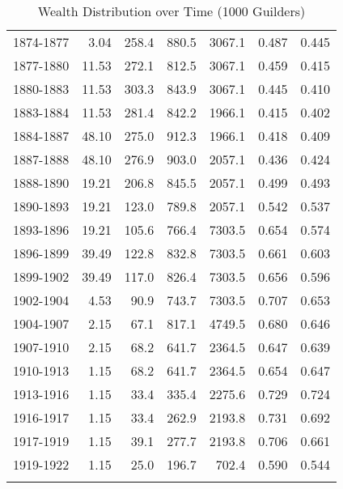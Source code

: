 \begin{table}[ht]
\begin{tabular}{lrrrrrr}
  1874-1877 & 3.04 & 258.4 & 880.5 & 3067.1 & 0.487 & 0.445 \\ 
  1877-1880 & 11.53 & 272.1 & 812.5 & 3067.1 & 0.459 & 0.415 \\ 
  1880-1883 & 11.53 & 303.3 & 843.9 & 3067.1 & 0.445 & 0.410 \\ 
  1883-1884 & 11.53 & 281.4 & 842.2 & 1966.1 & 0.415 & 0.402 \\ 
  1884-1887 & 48.10 & 275.0 & 912.3 & 1966.1 & 0.418 & 0.409 \\ 
  1887-1888 & 48.10 & 276.9 & 903.0 & 2057.1 & 0.436 & 0.424 \\ 
  1888-1890 & 19.21 & 206.8 & 845.5 & 2057.1 & 0.499 & 0.493 \\ 
  1890-1893 & 19.21 & 123.0 & 789.8 & 2057.1 & 0.542 & 0.537 \\ 
  1893-1896 & 19.21 & 105.6 & 766.4 & 7303.5 & 0.654 & 0.574 \\ 
  1896-1899 & 39.49 & 122.8 & 832.8 & 7303.5 & 0.661 & 0.603 \\ 
  1899-1902 & 39.49 & 117.0 & 826.4 & 7303.5 & 0.656 & 0.596 \\ 
  1902-1904 & 4.53 & 90.9 & 743.7 & 7303.5 & 0.707 & 0.653 \\ 
  1904-1907 & 2.15 & 67.1 & 817.1 & 4749.5 & 0.680 & 0.646 \\ 
  1907-1910 & 2.15 & 68.2 & 641.7 & 2364.5 & 0.647 & 0.639 \\ 
  1910-1913 & 1.15 & 68.2 & 641.7 & 2364.5 & 0.654 & 0.647 \\ 
  1913-1916 & 1.15 & 33.4 & 335.4 & 2275.6 & 0.729 & 0.724 \\ 
  1916-1917 & 1.15 & 33.4 & 262.9 & 2193.8 & 0.731 & 0.692 \\ 
  1917-1919 & 1.15 & 39.1 & 277.7 & 2193.8 & 0.706 & 0.661 \\ 
  1919-1922 & 1.15 & 25.0 & 196.7 & 702.4 & 0.590 & 0.544 \\ 
   \hline
\multicolumn{7}{l}{}\\
\end{tabular}
\endgroup
\caption{Wealth Distribution over Time (1000 Guilders)} 
\label{tab:ginicoef}
\end{table}